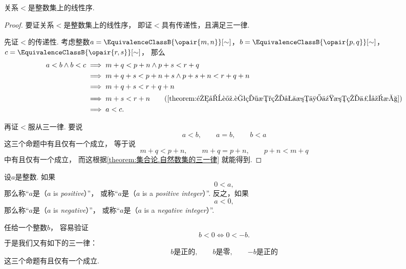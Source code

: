 \begin{theorem}\label{theorem:集合论.整数集上的序是线性序}
关系\(<\)是整数集上的线性序.
\begin{proof}
要证关系\(<\)是整数集上的线性序，
即证\(<\)具有传递性，且满足三一律.

先证\(<\)的传递性.
考虑整数\(a=\EquivalenceClassB{\opair{m,n}}[\sim]\)，\(b=\EquivalenceClassB{\opair{p,q}}[\sim]\)，\(c=\EquivalenceClassB{\opair{r,s}}[\sim]\)，
那么\begin{align*}
	a<b \land b<c
	&\implies
	m+q<p+n \land p+s<r+q \\
	&\implies
	m+q+s<p+n+s \land p+s+n<r+q+n \\
	&\implies
	m+q+s<r+q+n \\
	&\implies
	m+s<r+n
		\tag{\cref{theorem:集合论.自然数的加法与乘法的保序性}} \\
	&\implies
	a < c.
\end{align*}

再证\(<\)服从三一律.
要说\begin{equation*}
	a < b, \qquad
	a = b, \qquad
	b < a
\end{equation*}这三个命题中有且仅有一个成立，
等于说\begin{equation*}
	m+q<p+n, \qquad
	m+q=p+n, \qquad
	p+n<m+q
\end{equation*}中有且仅有一个成立，
而这根据\cref{theorem:集合论.自然数集的三一律} 就能得到.
\end{proof}
\end{theorem}

\begin{definition}
设\(a\)是整数.
如果\begin{equation*}
	0 < a,
\end{equation*}
那么称“\(a\)是（\(a\) is \emph{positive}）”，
或称“\(a\)是（\(a\) is a \emph{positive integer}）”.
反之，如果\begin{equation*}
	a < 0,
\end{equation*}
那么称“\(a\)是（\(a\) is \emph{negative}）”，
或称“\(a\)是（\(a\) is a \emph{negative integer}）”.
\end{definition}

任给一个整数\(b\)，
容易验证\begin{equation*}
	b < 0 \iff 0 < -b.
\end{equation*}
于是我们又有如下的三一律：
\begin{equation*}
	\text{\(b\)是正的}, \qquad
	\text{\(b\)是零}, \qquad
	\text{\(-b\)是正的}
\end{equation*}这三个命题有且仅有一个成立.

